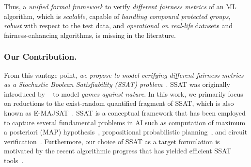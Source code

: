 Thus, a \textit{unified formal framework} to verify \textit{different fairness metrics} of an ML algorithm, which is \textit{scalable}, capable of \textit{handling compound protected groups}, \textit{robust} with respect to the test data, and \textit{operational on real-life} datasets and fairness-enhancing algorithms, is missing in the literature.

\subsubsection{Our Contribution.} From this vantage point, \textit{we propose to model verifying different fairness metrics as a Stochastic Boolean Satisfiability (SSAT) problem}~\cite{littman2001stochastic}.
SSAT was originally introduced by ~\cite{papadimitriou1985games} to model {\em games against nature}. In this work, we primarily focus on reductions to the exist-random quantified fragment of SSAT, which is also known as E-MAJSAT~\cite{littman2001stochastic}. 
SSAT is a conceptual framework that has been employed to capture several fundamental problems in AI such as computation of maximum a posteriori (MAP) hypothesis~\cite{fremont2017maximum},  propositional probabilistic planning~\cite{majercik2007appssat},  and circuit verification~\cite{lee2018towards}.
Furthermore, our choice of SSAT as a target formulation is motivated by the recent algorithmic progress that has yielded efficient SSAT tools~\cite{lee2017solving,lee2018solving}.





